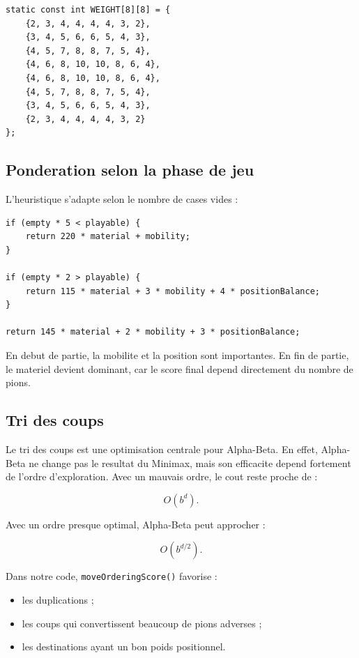 \documentclass[12pt,a4paper]{article}
\begin{document}
    \begin{lstlisting}
static const int WEIGHT[8][8] = {
    {2, 3, 4, 4, 4, 4, 3, 2},
    {3, 4, 5, 6, 6, 5, 4, 3},
    {4, 5, 7, 8, 8, 7, 5, 4},
    {4, 6, 8, 10, 10, 8, 6, 4},
    {4, 6, 8, 10, 10, 8, 6, 4},
    {4, 5, 7, 8, 8, 7, 5, 4},
    {3, 4, 5, 6, 6, 5, 4, 3},
    {2, 3, 4, 4, 4, 4, 3, 2}
};
    \end{lstlisting}

    \subsection{Ponderation selon la phase de jeu}

    L'heuristique s'adapte selon le nombre de cases vides :

    \begin{lstlisting}
if (empty * 5 < playable) {
    return 220 * material + mobility;
}

if (empty * 2 > playable) {
    return 115 * material + 3 * mobility + 4 * positionBalance;
}

return 145 * material + 2 * mobility + 3 * positionBalance;
    \end{lstlisting}

    En debut de partie, la mobilite et la position sont importantes. En fin de partie, le materiel devient
    dominant, car le score final depend directement du nombre de pions.

    \subsection{Tri des coups}

    Le tri des coups est une optimisation centrale pour Alpha-Beta. En effet, Alpha-Beta ne change pas le
    resultat du Minimax, mais son efficacite depend fortement de l'ordre d'exploration. Avec un mauvais
    ordre, le cout reste proche de :

    \[
        O(b^d).
    \]

    Avec un ordre presque optimal, Alpha-Beta peut approcher :

    \[
        O(b^{d/2}).
    \]

    Dans notre code, \texttt{moveOrderingScore()} favorise :

    \begin{itemize}[nosep]
    \item les duplications ;
    \item les coups qui convertissent beaucoup de pions adverses ;
    \item les destinations ayant un bon poids positionnel.
    \end{itemize}
\end{document}
